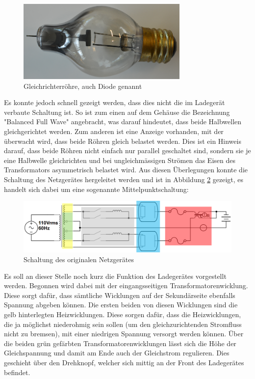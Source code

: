 \begin{figure}[h]
	\centering
		\includegraphics[width=0.75\textwidth]{images/Roehre_Diode.jpg}
	\caption{Gleichrichterröhre, auch Diode genannt}
	\label{fig:Roehre_Diode}
\end{figure}

Es konnte jedoch schnell gezeigt werden, dass dies nicht die im Ladegerät verbaute Schaltung ist. So ist zum einen auf dem Gehäuse die Bezeichnung "Balanced Full Wave" angebracht, was darauf hindeutet, dass beide Halbwellen gleichgerichtet werden. Zum anderen ist eine Anzeige vorhanden, mit der überwacht wird, dass beide Röhren gleich belastet werden. Dies ist ein Hinweis darauf, dass beide Röhren nicht einfach nur parallel geschaltet sind, sondern sie je eine Halbwelle gleichrichten und bei ungleichmässigen Strömen das Eisen des Transformators asymmetrisch belastet wird. Aus diesen Überlegungen konnte die Schaltung des Netzgerätes hergeleitet werden und ist in Abbildung \ref{fig:Schema_Ladegeraet_Alt} gezeigt, es handelt sich dabei um eine sogenannte Mittelpunktschaltung:

\begin{figure}[h]
	\centering
		\includegraphics[width=1.00\textwidth]{images/Ladegeraet_Alt_2.PNG}
	\caption{Schaltung des originalen Netzgerätes}
	\label{fig:Schema_Ladegeraet_Alt}
\end{figure}

Es soll an dieser Stelle noch kurz die Funktion des Ladegerätes vorgestellt werden. Begonnen wird dabei mit der eingangsseitigen Transformatorenwicklung. Diese sorgt dafür, dass sämtliche Wicklungen auf der Sekundärseite ebenfalls Spannung abgeben können. Die ersten beiden von diesen Wicklungen sind die gelb hinterlegten Heizwicklungen. Diese sorgen dafür, dass die Heizwicklungen, die ja möglichst niederohmig sein sollen (um den gleichzurichtenden Stromfluss nicht zu bremsen), mit einer niedrigen Spannung versorgt werden können. Über die beiden grün gefärbten Transformatorenwicklungen lässt sich die Höhe der Gleichspannung und damit am Ende auch der Gleichstrom regulieren. Dies geschieht über den Drehknopf, welcher sich mittig an der Front des Ladegerätes befindet.

